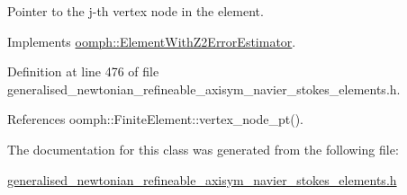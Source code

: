 Pointer to the j-\/th vertex node in the element. 



Implements \hyperlink{classoomph_1_1ElementWithZ2ErrorEstimator_a0eedccc33519f852c5dc2055ddf2774b}{oomph\+::\+Element\+With\+Z2\+Error\+Estimator}.



Definition at line 476 of file generalised\+\_\+newtonian\+\_\+refineable\+\_\+axisym\+\_\+navier\+\_\+stokes\+\_\+elements.\+h.



References oomph\+::\+Finite\+Element\+::vertex\+\_\+node\+\_\+pt().



The documentation for this class was generated from the following file\+:\begin{DoxyCompactItemize}
\item 
\hyperlink{generalised__newtonian__refineable__axisym__navier__stokes__elements_8h}{generalised\+\_\+newtonian\+\_\+refineable\+\_\+axisym\+\_\+navier\+\_\+stokes\+\_\+elements.\+h}\end{DoxyCompactItemize}
